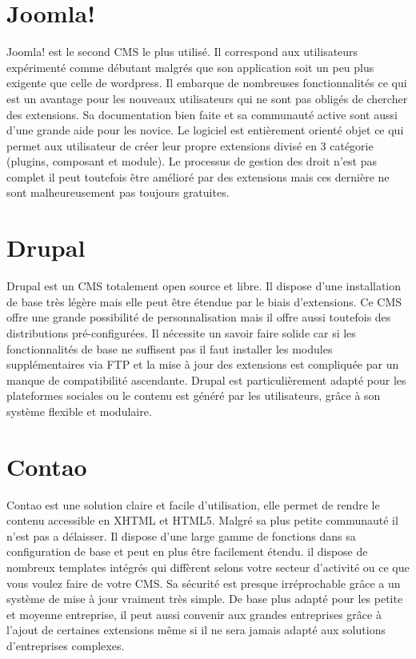 \documentclass[a4paper,12pt]{report}
\begin{document}
\section{Joomla!}

Joomla! est le second CMS le plus utilisé. Il correspond aux
utilisateurs expérimenté comme débutant malgrés que son application
soit un peu plus exigente que celle de wordpress. Il embarque de
nombreuses fonctionnalités ce qui est un avantage pour les nouveaux
utilisateurs qui ne sont pas obligés de chercher des extensions. Sa
documentation bien faite et sa communauté active sont aussi d'une
grande aide pour les novice.  Le logiciel est entièrement orienté
objet ce qui permet aux utilisateur de créer leur propre extensions
divisé en 3 catégorie (plugins, composant et module).  Le processus de
gestion des droit n'est pas complet il peut toutefois être amélioré
par des extensions mais ces dernière ne sont malheureusement pas
toujours gratuites.

\section{Drupal}

Drupal est un CMS totalement open source et libre. Il dispose d'une
installation de base très légère mais elle peut être étendue par le
biais d’extensions. Ce CMS offre une grande possibilité de
personnalisation mais il offre aussi toutefois des distributions
pré-configurées.  Il nécessite un savoir faire solide car si les
fonctionnalités de base ne suffisent pas il faut installer les modules
supplémentaires via FTP et la mise à jour des extensions est
compliquée par un manque de compatibilité ascendante.  Drupal est
particulièrement adapté pour les plateformes sociales ou le contenu
est généré par les utilisateurs, grâce à son système flexible et
modulaire.

\section{Contao}

Contao est une solution claire et facile d'utilisation, elle permet de
rendre le contenu accessible en XHTML et HTML5. Malgré sa plus petite
communauté il n'est pas a délaisser.  Il dispose d'une large gamme de
fonctions dans sa configuration de base et peut en plus être
facilement étendu. il dispose de nombreux templates intégrés qui
diffèrent selons votre secteur d'activité ou ce que vous voulez faire
de votre CMS.  Sa sécurité est presque irréprochable grâce a un
système de mise à jour vraiment très simple. De base plus adapté pour
les petite et moyenne entreprise, il peut aussi convenir aux grandes
entreprises grâce à l'ajout de certaines extensions même si il ne sera
jamais adapté aux solutions d'entreprises complexes.
\end{document}
